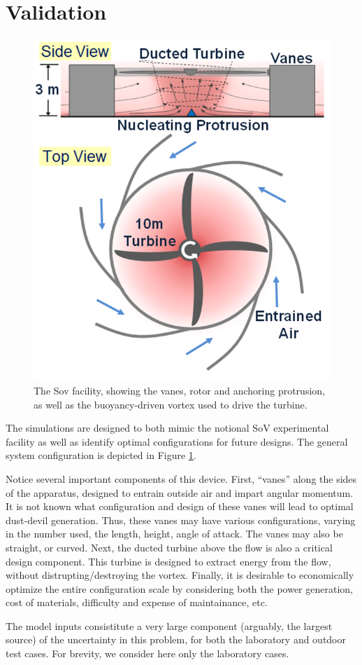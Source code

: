  
\section{Validation}
\label{sec:validation}


\begin{figure}[h]
 \begin{center}
  \includegraphics[width=.5\linewidth]{fig/power_generation.png}
   \caption{The Sov facility, showing the vanes, rotor and anchoring
   protrusion, as well as the buoyancy-driven vortex used to drive the
   turbine.}
   \label{facility}
  \end{center}
\end{figure}

The simulations are designed to both mimic the notional SoV experimental
facility as well as identify optimal configurations for future
designs. The general system configuration is depicted in Figure
\ref{facility}. 

Notice several important components of this device. First, ``vanes''
along the sides of the apparatus, designed to entrain outside air and
impart angular momentum. It is not known what configuration and design
of these vanes will lead to optimal dust-devil generation. Thus, these
vanes may have various configurations, varying in the number used, the
length, height, angle of attack. The vanes may also be straight, or
curved.  Next, the ducted turbine above the flow is also a critical design
component. This turbine is designed to extract energy from the flow,
without distrupting/destroying the vortex. Finally, it is desirable to
economically optimize the entire configuration scale by considering both
the power generation, cost of materials, difficulty and expense of
maintainance, etc. 

The model inputs consistitute a very large component (arguably, the
largest source) of the uncertainty in this problem, for both the
laboratory and outdoor test cases. For brevity, we consider here only
the laboratory cases. 

